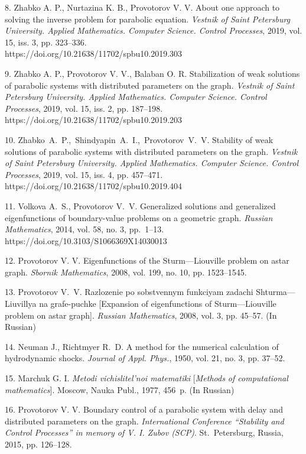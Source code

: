 {8. Zhabko A. P., Nurtazina K. B., Provotorov V. V.  About one
approach to solving the inverse problem for parabolic equation.
\emph{Vestnik of Saint Petersburg University. Applied Mathematics.
Computer Science. Control Processes}, 2019, vol. 15, iss. 3, pp.
323--336.\\   https://doi.org/10.21638/11702/spbu10.2019.303

9. Zhabko A. P.,  Provotorov V. V., Balaban O. R.  Stabilization
of weak solutions of pa\-ra\-bo\-lic systems with distributed
parameters on the graph. \emph{Vestnik of Saint Petersburg
University. Ap\-plied Mathematics. Computer Science. Control
Processes}, 2019, vol. 15, iss. 2, pp. 187--198.\\
https://doi.org/10.21638/11702/spbu10.2019.203

10. Zhabko~A.~P.,~Shindyapin~A.~I.,~Provotorov~V.~V.  Stability of
weak solutions of parabolic systems with distributed parameters on
the graph. \textit{Vestnik of Saint Petersburg University. Applied
Mathematics. Computer Science. Control Processes}, 2019, vol. 15,
iss. 4, pp. 457--471.\\
https://doi.org/10.21638/11702/spbu10.2019.404

11. Volkova A.~S., Provotorov V.~V.  Generalized solutions and
generalized eigenfunctions of boundary-value problems on a
geometric graph. \emph{Russian Mathematics}, 2014, vol. 58, no. 3,
pp.~1--13. https://doi.org/10.3103/S1066369X14030013

12. Provotorov V. V. Eigenfunctions of  the Sturm---Liouville
problem on astar graph. \emph{Sbornik  Mathematics}, 2008, vol.
199, no. 10, pp. 1523--1545.

13. Provotorov V.~V. Razlozenie po sobstvennym funkciyam zadachi
Shturma---Liuvillya na grafe-puchke [Expansion  of eigenfunctions
of Sturm---Liouville problem on astar graph]. \emph{Russian
Mathematics}, 2008, vol. 3, pp. 45--57. (In Russian)

14. Neuman J., Richtmyer R.~D.  A method for the numerical
calculation of hydrodynamic shocks. \emph{Journal of  Appl.
Phys.}, 1950, vol. 21, no. 3, pp. 37--52.

15. Marchuk G. I. \emph{Metodi vichislitel'noi matematiki}
[\textit{Methods of computational mathematics}]. Moscow, Nauka
Publ., 1977, 456~p. (In Russian)

16. Provotorov V. V. Boundary control of a parabolic system with
delay and distributed parameters on the graph. \emph{International
Conference ``Stability and Control Processes'' in memory of V. I.
Zubov (SCP)}. St.~Petersburg, Russia, 2015, pp. 126--128.

}
